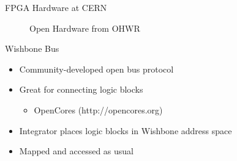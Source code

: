 \documentclass{beamer}
\begin{document}
\begin{frame}{FPGA Hardware at CERN}
\begin{figure}
\begin{center}
\hspace{0.3in}
\caption{Open Hardware from OHWR}
\label{fig1}
\end{center}
\end{figure}
\end{frame}

\begin{frame}{Wishbone Bus}
  \begin{itemize}
    \item Community-developed open bus protocol
    \pause \item Great for connecting logic blocks %
      \begin{itemize}
        \pause \item OpenCores (http://opencores.org)
      \end{itemize}
    \pause \item Integrator places logic blocks in Wishbone address space
    \pause \item Mapped and accessed as usual
  \end{itemize}
\end{frame}
\end{document}
